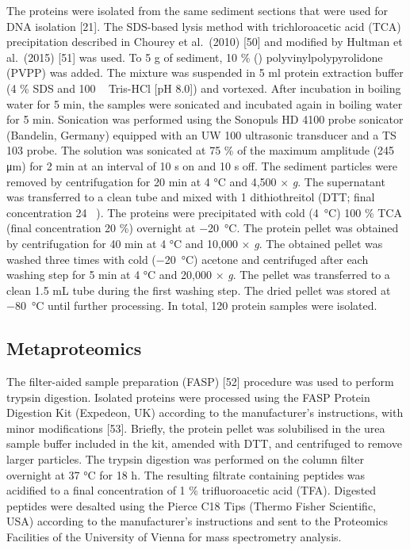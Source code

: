 \documentclass[
  12 pt,
]{article}
\begin{document}
The proteins were isolated from the same sediment sections that were used for DNA isolation {[}21{]}. The SDS-based lysis method with trichloroacetic acid (TCA) precipitation described in Chourey et al.~(2010) {[}50{]} and modified by Hultman et al.~(2015) {[}51{]} was used. To 5 \si{\gram} of sediment, 10 \si{\percent} (\si{\wW}) polyvinylpolypyrolidone (PVPP) was added. The mixture was suspended in 5 \si{\ml} protein extraction buffer (4 \si{\percent} SDS and 100 \si{\milli\Molar} Tris-HCl {[}pH 8.0{]}) and vortexed. After incubation in boiling water for 5 \si{\minute}, the samples were sonicated and incubated again in boiling water for 5 \si{\minute}. Sonication was performed using the Sonopuls HD 4100 probe sonicator (Bandelin, Germany) equipped with an UW 100 ultrasonic transducer and a TS 103 probe. The solution was sonicated at 75 \si{\percent} of the maximum amplitude (245 \si{\um}) for 2 \si{\minute} at an interval of 10 \si{\s} on and 10 \si{\s} off. The sediment particles were removed by centrifugation for 20 \si{\minute} at 4 \si{\degreeCelsius} and 4,500 × \emph{g}. The supernatant was transferred to a clean tube and mixed with 1 \si{\Molar} dithiothreitol (DTT; final concentration 24 \si{\milli\Molar}). The proteins were precipitated with cold (\SI{4}{\degreeCelsius}) 100 \si{\percent} TCA (final concentration 20 \si{\percent}) overnight at \SI{-20}{\degreeCelsius}. The protein pellet was obtained by centrifugation for 40 \si{\minute} at 4 \si{\degreeCelsius} and 10,000 × \emph{g}. The obtained pellet was washed three times with cold (\SI{-20}{\degreeCelsius}) acetone and centrifuged after each washing step for 5 \si{\minute} at 4 \si{\degreeCelsius} and 20,000 × \emph{g}. The pellet was transferred to a clean 1.5 \si{\milli\liter} tube during the first washing step. The dried pellet was stored at \SI{-80}{\degreeCelsius} until further processing. In total, 120 protein samples were isolated.

\hypertarget{metaproteomics}{%
\subsection{Metaproteomics}\label{metaproteomics}}

The filter-aided sample preparation (FASP) {[}52{]} procedure was used to perform trypsin digestion. Isolated proteins were processed using the FASP Protein Digestion Kit (Expedeon, UK) according to the manufacturer's instructions, with minor modifications {[}53{]}. Briefly, the protein pellet was solubilised in the urea sample buffer included in the kit, amended with DTT, and centrifuged to remove larger particles. The trypsin digestion was performed on the column filter overnight at 37 \si{\degreeCelsius} for 18 \si{\hour}. The resulting filtrate containing peptides was acidified to a final concentration of 1 \si{\percent} trifluoroacetic acid (TFA). Digested peptides were desalted using the Pierce C18 Tips (Thermo Fisher Scientific, USA) according to the manufacturer's instructions and sent to the Proteomics Facilities of the University of Vienna for mass spectrometry analysis.
\end{document}
